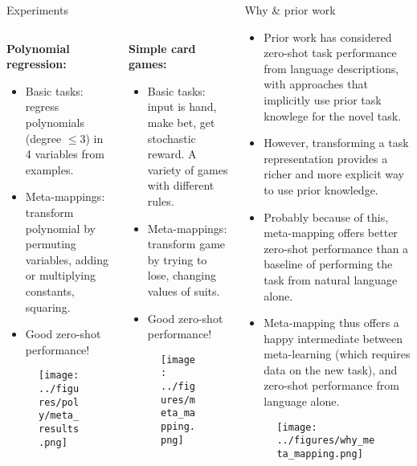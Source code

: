 \documentclass[final]{beamer}
\begin{document}
\begin{frame}[t]{}
\begin{columns}
\begin{column}[t]{0.496\textwidth}
\begin{block}{\huge Experiments}
\vspace{-0.5em}
\begin{columns}
\begin{column}[t]{0.48\textwidth}
\textbf{Polynomial regression:}
\begin{itemize}
\item Basic tasks: regress polynomials (degree \(\leq 3\)) in 4 variables from examples. 
\item Meta-mappings: transform polynomial by permuting variables, adding or multiplying constants, squaring. 
\item Good zero-shot performance!
\end{itemize}
\begin{figure}[H]
\texttt{[image: ../figures/poly/meta\_results.png]}
\end{figure}
\end{column}
\begin{column}[t]{0.48\textwidth}
\textbf{Simple card games:}
\begin{itemize}
\item Basic tasks: input is hand, make bet, get stochastic reward. A variety of games with different rules. 
\item Meta-mappings: transform game by trying to lose, changing values of suits. 
\item Good zero-shot performance!
\end{itemize}
\begin{figure}[H]
\texttt{[image: ../figures/meta\_mapping.png]}
\end{figure}
\end{column}
\end{columns}
\end{block}
\end{column}


\begin{column}[t]{0.248\textwidth}
\begin{block}{\huge Why \& prior work}
\begin{itemize}
\item Prior work has considered zero-shot task performance from language descriptions, with approaches that implicitly use prior task knowlege for the novel task.
\item However, transforming a task representation provides a richer and more explicit way to use prior knowledge.
\item Probably because of this, meta-mapping offers better zero-shot performance than a baseline of performing the task from natural language alone.
\item Meta-mapping thus offers a happy intermediate between meta-learning (which requires data on the new task), and zero-shot performance from language alone.
\end{itemize}
\begin{figure}[H]
\centering
\texttt{[image: ../figures/why\_meta\_mapping.png]}
\label{fig_why_meta_mapping}
\end{figure}


\end{block}
\end{column}
\end{columns}
\end{frame}
\end{document}
